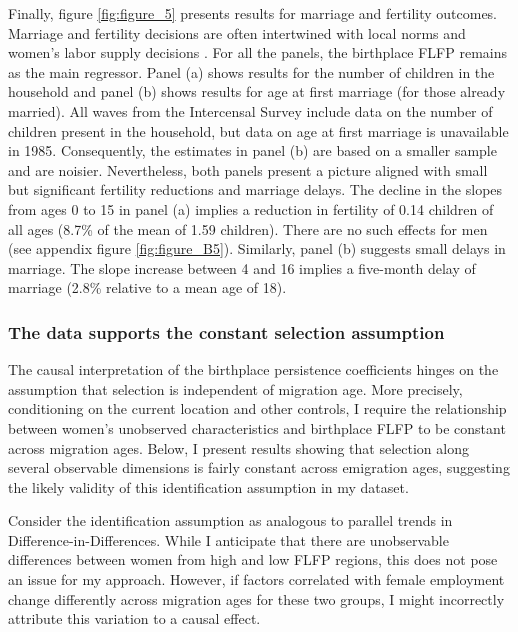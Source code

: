 Finally, figure \ref{fig:figure_5} presents results for marriage and fertility outcomes. Marriage and fertility decisions are often intertwined with local norms and women's labor supply decisions \citep{Fernandez2009,Jayachandran2021}. For all the panels, the birthplace FLFP remains as the main regressor.  Panel (a) shows results for the number of children in the household and panel (b) shows results for age at first marriage (for those already married). All waves from the Intercensal Survey include data on the number of children present in the household, but data on age at first marriage is unavailable in 1985. Consequently, the estimates in panel (b) are based on a smaller sample and are noisier. Nevertheless, both panels present a picture aligned with small but significant fertility reductions and marriage delays. The decline in the slopes from ages 0 to 15 in panel (a) implies a reduction in fertility of 0.14 children of all ages (8.7\% of the mean of 1.59 children). There are no such effects for men (see appendix figure \ref{fig:figure_B5}). Similarly, panel (b) suggests small delays in marriage.   The slope increase between 4 and 16 implies a five-month delay of marriage (2.8\% relative to a mean age of 18).

\tftext{}



\subsubsection{The data supports the constant selection assumption}

The causal interpretation of the birthplace persistence coefficients hinges on the assumption that selection is independent of migration age. More precisely, conditioning on the current location and other controls, I require the relationship between women's unobserved characteristics and birthplace FLFP to be constant across migration ages. Below, I present results showing that selection along several observable dimensions is fairly constant across emigration ages, suggesting the likely validity of this identification assumption in my dataset.


Consider the identification assumption as analogous to parallel trends in Difference-in-Differences. While I anticipate that there are unobservable differences between women from high and low FLFP regions, this does not pose an issue for my approach. However, if factors correlated with female employment change differently across migration ages for these two groups, I might incorrectly attribute this variation to a causal effect. %


